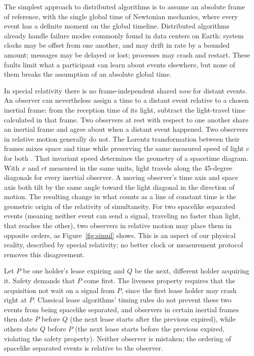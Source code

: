 \documentclass[final,5p,times,twocolumn,number]{elsarticle}
\newcommand{\figref}[1]{Figure~\ref*{#1}}
\begin{document}
The simplest approach to distributed algorithms is to assume an absolute frame of reference, with the single global time of Newtonian mechanics, where every event has a definite moment on the global timeline.  Distributed algorithms already handle failure modes commonly found in data centers on Earth: system clocks may be offset from one another, and may drift in rate by a bounded amount; messages may be delayed or lost; processes may crash and restart.  These faults limit what a participant can learn about events elsewhere, but none of them breaks the assumption of an absolute global time.

In special relativity there is no frame-independent shared \emph{now} for distant events.  An observer can nevertheless assign a time to a distant event relative to a chosen inertial frame: from the reception time of its light, subtract the light-travel time calculated in that frame.  Two observers at rest with respect to one another share an inertial frame and agree about when a distant event happened.  Two observers in relative motion generally do not.  The Lorentz transformation between their frames mixes space and time while preserving the same measured speed of light $c$ for both \cite{ref6}.  That invariant speed determines the geometry of a spacetime diagram.  With $x$ and $ct$ measured in the same units, light travels along the 45-degree diagonals for every inertial observer.  A moving observer's time axis and space axis both tilt by the same angle toward the light diagonal in the direction of motion.  The resulting change in what counts as a line of constant time is the geometric origin of the relativity of simultaneity.  For two spacelike separated events (meaning neither event can send a signal, traveling no faster than light, that reaches the other), two observers in relative motion may place them in opposite orders, as \figref{fig:simul} shows.  This is an aspect of our physical reality, described by special relativity; no better clock or measurement protocol removes this disagreement.

Let $P$ be one holder's lease expiring and $Q$ be the next, different holder acquiring it.  Safety demands that $P$ come first.  The liveness property requires that the acquisition not wait on a signal from $P$, since the first lease holder may crash right at $P$.  Classical lease algorithms' timing rules do not prevent these two events from being spacelike separated, and observers in certain inertial frames then date $P$ before $Q$ (the next lease starts after the previous expired), while others date $Q$ before $P$ (the next lease starts before the previous expired, violating the safety property).  Neither observer is mistaken; the ordering of spacelike separated events is relative to the observer.
\end{document}

